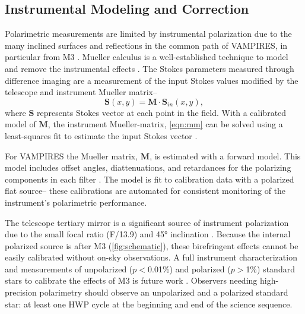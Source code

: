 \subsection{Instrumental Modeling and Correction}

Polarimetric measurements are limited by instrumental polarization due to the many inclined surfaces and reflections in the common path of VAMPIRES, in particular from M3 \citep{tinbergen_accurate_2007}. Mueller calculus is a well-established technique to model and remove the instrumental effects \citep{perrin_polarimetry_2015,holstein_polarimetric_2020,joost_t_hart_full_2021}. The Stokes parameters measured through difference imaging are a measurement of the input Stokes values modified by the telescope and instrument Mueller matrix--
\begin{equation}
    \mathbf{S}(x, y) = \mathbf{M}\cdot\mathbf{S}_{in}(x, y),
    \label{eqn:mm}
\end{equation}
where $\mathbf{S}$ represents Stokes vector at each point in the field. With a calibrated model of $\mathbf{M}$, the instrument Mueller-matrix, \autoref{eqn:mm} can be solved using a least-squares fit to estimate the input Stokes vector \citep{perrin_polarimetry_2015}.

For VAMPIRES the Mueller matrix, $\mathbf{M}$, is estimated with a forward model. This model includes offset angles, diattenuations, and retardances for the polarizing components in each filter \citep{zhang_characterizing_2023}. The model is fit to calibration data with a polarized flat source-- these calibrations are automated for consistent monitoring of the instrument's polarimetric performance. 

The telescope tertiary mirror is a significant source of instrument polarization due to the small focal ratio (F/13.9) and \ang{45} inclination \citep{schmid_spherezimpol_2018,van_holstein_polarization-dependent_2023}. Because the internal polarized source is after M3 (\autoref{fig:schematic}), these birefringent effects cannot be easily calibrated without on-sky observations. A full instrument characterization and measurements of unpolarized ($p<$0.01\%) and polarized ($p>$1\%) standard stars to calibrate the effects of M3 is future work \citep{zhang_characterizing_2023}. Observers needing high-precision polarimetry should observe an unpolarized and a polarized standard star: at least one HWP cycle at the beginning and end of the science sequence.
